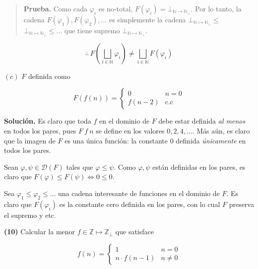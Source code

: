 \documentclass[a4paper, 12pt]{article}
\begin{document}
\small
\begin{quote}

\textbf{Prueba.} Como cada $\varphi_i$ es no-total, $F(\varphi_i) = \bot_{\mathbb{N}\to
\mathbb{N}_\bot }$. Por lo tanto, la cadena $F(\varphi_1), F(\varphi_2), \ldots$
es simplemente la cadena $\bot_{\mathbb{N}\mapsto\mathbb{N}_\bot } \leq$
$\bot_{\mathbb{N}\mapsto\mathbb{N}_\bot } \leq \ldots$ que tiene supremo $\bot_{\mathbb{N}\mapsto\mathbb{N}_\bot }$. 

\end{quote}
\normalsize

\begin{equation*}
  \therefore  ~ F\left( \bigsqcup_{i \in \mathbb{N}} \varphi_i \right) \neq \bigsqcup_{i \in
  \mathbb{N}} F(\varphi_i)
\end{equation*}

\pagebreak

$(c)$ $F$ definida como 

\begin{equation*}
  F\left( f\left( n \right)  \right) = \begin{cases}
    0 & n = 0 \\ 
    f(n-2) & \text{c.c}
  \end{cases}
\end{equation*}

\textbf{Solución.} Es claro que toda $f$ en el dominio de $F$ debe estar
definida \textit{al menos} en todos los pares, pues $F~ f~ n$ se define en los
valores $0, 2, 4, \ldots$. Más aún, es claro que la imagen de $F$ es una única
función: la constante $0$ definida \textit{únicamente} en todos los pares. 

Sean $\varphi, \psi \in \mathcal{D}(F)$ tales que $\varphi \leq \psi$. Como
$\varphi, \psi$ están definidas en los pares, es claro que $F(\varphi) \leq
F(\psi) \iff 0 \leq 0$. 

Sea $\varphi_1 \leq \varphi_2 \leq \ldots$ una cadena interesante de funciones
en el dominio de $F$. Es claro que $F(\varphi_i)$ es la constante cero definida
en los pares, con lo cual $F$ preserva el supremo y etc.


\pagebreak 

\textbf{(10)} Calcular la menor $f \in \mathbb{Z} \mapsto \mathbb{Z}_\bot$ que
satisface 

\begin{equation*}
  f(n) = \begin{cases}
    1 & n = 0 \\ 
    n \cdot f(n-1) & n \neq 0
  \end{cases}
\end{equation*}
\end{document}
